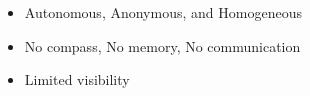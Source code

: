 \begin{frame}{}

\begin{columns}[T,totalwidth=\textwidth]
\begin{itemize}\setlength\itemsep{0.4cm}
  \item<1-> Autonomous, Anonymous, and Homogeneous
  \item<1-> No compass, No memory, No communication
  \item<1-> Limited visibility
\end{itemize}

\vspace{0.6cm}
\resizebox{\linewidth}{!}{}
\end{columns}

\end{frame}
